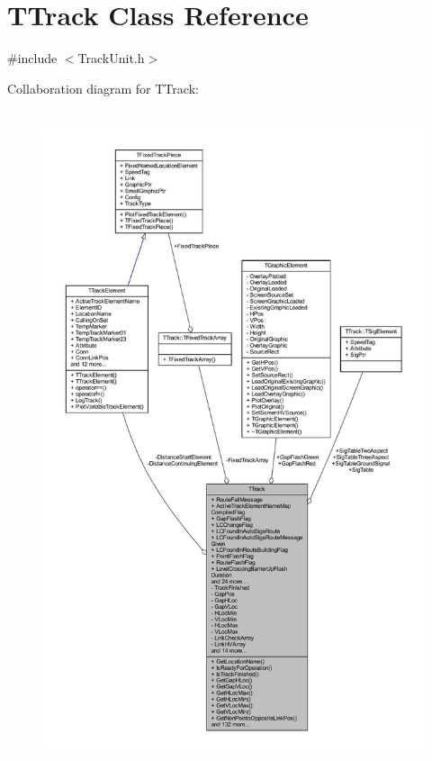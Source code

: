 \hypertarget{class_t_track}{}\section{T\+Track Class Reference}
\label{class_t_track}


{\ttfamily \#include $<$Track\+Unit.\+h$>$}



Collaboration diagram for T\+Track\+:
\nopagebreak
\begin{figure}[H]
\begin{center}
\leavevmode
\includegraphics[height=550pt]{class_t_track__coll__graph}
\end{center}
\end{figure}
